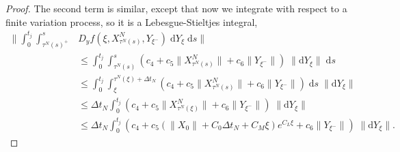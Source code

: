 \documentclass[reqno,12pt]{amsart}
\theoremstyle{plain} %
\theoremstyle{definition} %
\begin{document}
\begin{proof}
    The second term is similar, except that now we integrate with respect to a finite variation process, so it is a Lebesgue-Stieltjes integral,
    \begin{align*}
        \bigg\|\int_0^{t_j} \int_{\tau^N(s)^+}^s & D_y f(\xi, X_{\tau^N(s)}^N, Y_{\xi^-}) \;\mathrm{d}Y_\xi\;\mathrm{d}s\bigg\| \\
        & \leq \int_0^{t_j} \int_{\tau^N(s)}^s \left(c_4 + c_5 \|X_{\tau^N(s)}^N\| + c_6\|Y_{\xi^-}\|\right)\;\|\mathrm{d}Y_\xi\|\;\mathrm{d}s \\
        & \leq \int_0^{t_j} \int_{\xi}^{\tau^N(\xi) + \Delta t_N} \left(c_4 + c_5 \|X_{\tau^N(s)}^N\| + c_6\|Y_{\xi^-}\|\right)\;\mathrm{d}s\;\|\mathrm{d}Y_\xi\| \\
        & \leq \Delta t_N\int_0^{t_j} \left(c_4 + c_5 \|X_{\tau^N(\xi)}^N\| + c_6\|Y_{\xi^-}\|\right)\;\|\mathrm{d}Y_\xi\| \\
        & \leq \Delta t_N\int_0^{t_j} \left(c_4 + c_5 \left(\|X_0\| + C_0\Delta t_N + C_M \xi \right)e^{C_L \xi} + c_6\|Y_{\xi^-}\|\right)\;\|\mathrm{d}Y_\xi\|.
    \end{align*}


\end{proof}
\end{document}
